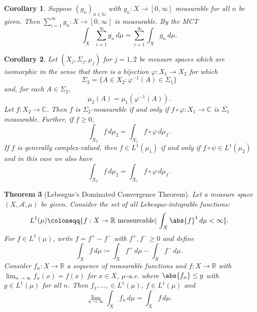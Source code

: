 \documentclass[11pt, letter]{book}
\newtheorem{theorem}{Theorem}[section]
\newtheorem{corollary}[theorem]{Corollary}
\begin{document}
\begin{corollary}
Suppose $(g_n)_{n\in \mathbb{N}}$ with $g_n : X \to [0,\infty]$ measurable for all $n$ be given. Then  $\sum^\infty_{i=1}g_n : X \to [0, \infty]$ is measurable. By the MCT
\begin{equation*}
    \int_X \sum^\infty_{i=1} g_n \,d\mu = \sum^\infty_{i=1} \int_X g_n \,d\mu.
\end{equation*}
\end{corollary}


\begin{corollary}
Let $(X_j,\Sigma_j,\mu_j)$ for $j=1,2$ be measure spaces which are isomorphic in the sense that there is a bijection $\varphi:X_1\to X_2$ for which
\begin{equation*}
\Sigma_2=\{A\in X_2:\varphi^{-1}(A)\in\Sigma_1\}
\end{equation*}
and, for each $A\in\Sigma_2$,
\begin{equation*}
\mu_2(A)=\mu_1(\varphi^{-1}(A)).
\end{equation*}
Let $f:X_2\to\mathbb{C}$. Then $f$ is $\Sigma_2$-measurable if and only if $f\circ \varphi:X_1\to\mathbb{C}$ is $\Sigma_1$ measurable. Further, if $f\geq 0$,
\begin{equation*}
\int_{X_2}f\,d\mu_2=\int_{X_1}f\circ \varphi\,d\mu_1.
\end{equation*}
If $f$ is generally complex-valued, then $f\in L^1(\mu_1)$ if and only if $f\circ \psi\in L^1(\mu_2)$ and in this case we also have
\begin{equation*}
\int_{X_2}f\,d\mu_2=\int_{X_1}f\circ \varphi\,d\mu_1.
\end{equation*}
\end{corollary}

\begin{theorem}[Lebesgue's Dominated Convergence Theorem]
Let a measure space $(X,\mathcal{A},\mu)$ be given. Consider the set of all Lebesgue-integrable functions:
\begin{equation*}
    L^1(\mu) \coloneqq \{ f: X \to \mathbb{R} \text{ measureable}\vert \, \int_X \abs{f}^1\,d\mu < \infty \}.
\end{equation*}
For $f\in L^{1}(\mu)$, write $f = f^+ - f^-$ with $f^+,f^- \geq 0$ and define
\begin{equation*}
    \int_X f\,d\mu \coloneqq \int_X f^+ \,d\mu - \int_X f^- \,d\mu.
\end{equation*}
Consider $f_n : X \to \mathbb{R}$ a sequence of measurable functions and $f : X \to \mathbb{R}$ with $\lim_{n\to \infty} f_n(x) = f(x)$ for $x\in X$, $\mu$-a.e. where $\abs{f_n} \leq g$ with $g\in L^1(\mu)$ for all $n$. Then $f_1, \dots, \in L^{1}(\mu)$, $f\in L^{1}(\mu)$ and 
\begin{equation*}
    \lim_{n\to \infty} \int_X f_n\,d\mu = \int_X f\,d\mu.
\end{equation*}
\end{theorem}
\end{document}
